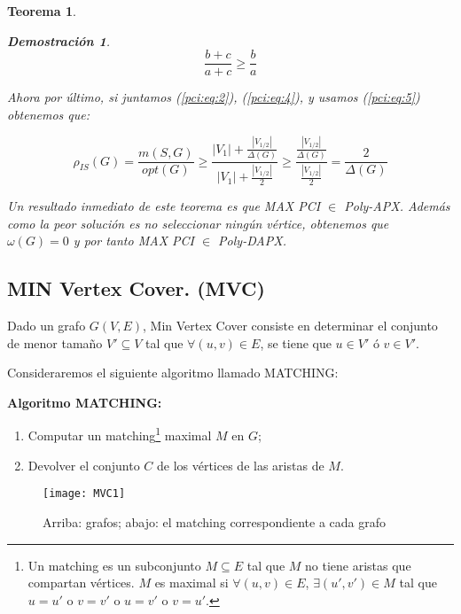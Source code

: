 \documentclass[a4paper,12pt,titlepage]{article}
\newtheorem{teo}{Teorema}[section]
\newtheorem*{dem}{\textbf{Demostraci\'on}}
\begin{document}
\begin{teo}
\begin{dem}
\begin{equation} \label{pci:eq:5}
\frac{b + c}{a + c} \geq \frac{b}{a}
\end{equation}

Ahora por \'ultimo, si juntamos (\ref{pci:eq:2}), (\ref{pci:eq:4}), y usamos (\ref{pci:eq:5}) obtenemos que:

\begin{equation} \label{pci:eq:6}
\rho_{IS}(G) = \frac{m(S,G)}{opt(G)} \geq \frac{|V_1| + \frac{|V_{1/2}|}{\Delta(G)}}{|V_1| + \frac{|V_{1/2}|}{2}} \geq \frac{\frac{|V_{1/2}|}{\Delta(G)}}{\frac{|V_{1/2}|}{2}} = \frac{2}{\Delta(G)}
\end{equation}

\end{dem}

Un resultado inmediato de este teorema es que MAX PCI $\in$ Poly-APX. Adem\'as como la peor soluci\'on es no seleccionar ning\'un v\'ertice, obtenemos que $\omega(G) = 0$ y por tanto MAX PCI $\in$ Poly-DAPX.

\end{teo}

\subsection{MIN Vertex Cover. (MVC)}
\label{sec:MVC}

Dado un grafo $G(V,E)$, Min Vertex Cover consiste en determinar el conjunto de menor tamaño $V' \subseteq V$ tal que $\forall (u,v)\in E$, se tiene que $u \in V'$ \'o $v \in V'$.

Consideraremos el siguiente algoritmo llamado MATCHING:

\vspace{0.3cm}

\textbf{Algoritmo MATCHING:}

\begin{enumerate}
\item Computar un matching\footnote{Un matching es un subconjunto $ M \subseteq E$ tal que $M$ no tiene aristas que compartan v\'ertices. $M$ es maximal si $\forall (u,v)\in E$, $\exists(u',v')\in M$ tal que $u=u'$ o $v=v'$ o $u=v'$ o $v=u'$.} maximal $M$ en $G$;
\item Devolver el conjunto $C$ de los v\'ertices de las aristas de $M$.
\end{enumerate}

\begin{figure}[h]
\centering
\texttt{[image: MVC1]}
\caption{Arriba: grafos; abajo: el matching correspondiente a cada grafo}
\label{mvc:fig:1}
\end{figure}
\end{document}
